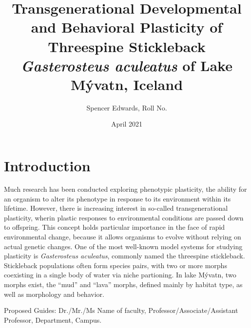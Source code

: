 \documentclass[12pt]{extarticle}
\title{Transgenerational Developmental and Behavioral Plasticity of Threespine Stickleback \textit{Gasterosteus aculeatus} of Lake M\'yvatn, Iceland}
\author{Spencer Edwards, Roll No.}
\date{April 2021}
\begin{document}
\maketitle

\section*{Introduction}
Much research has been conducted exploring phenotypic plasticity, the ability for an organism to alter its phenotype in response to its environment within its lifetime. However, there is increasing interest in so-called transgenerational plasticity, wherin plastic responses to environmental conditions are passed down to offspring. This concept holds particular importance in the face of rapid environmental change, because it allows organisms to evolve without relying on actual genetic changes. One of the most well-known model systems for studying plasticity is \textit{Gasterosteus aculeatus}, commonly named the threespine stickleback. Stickleback populations often form species pairs, with two or more morphs coexisting in a single body of water via niche partioning. In lake M\'yvatn, two morphs exist, the ``mud'' and ``lava'' morphs, defined mainly by habitat type, as well as morphology and behavior. 

Proposed Guides: Dr./Mr./Ms Name of faculty, Professor/Associate/Assistant Professor, Department, Campus.
\end{document}
